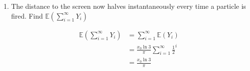 \documentclass[10pt,\jkfside,a4paper]{article}
\begin{document}
\begin{enumerate}
\begin{enumerate}
\item
The distance to the screen now halves instantaneously every time a particle is fired.
Find $\mathbb{E}\left(\sum^\infty_{i=1} Y_i\right)$

\[
\begin{split}
\mathbb{E}\left(\sum^\infty_{i=1} Y_i\right) &= \sum^{\infty}_{i=1} \mathbb{E}(Y_i) \\
											 &= \frac{x_0\ln 3}{\pi} \sum^{\infty}_{i=1} \frac{1}{2}^i \\
                                             &= \frac{x_0\ln 3}{\pi} \\
\end{split}
\]

\end{enumerate}

\end{enumerate}
\end{document}
